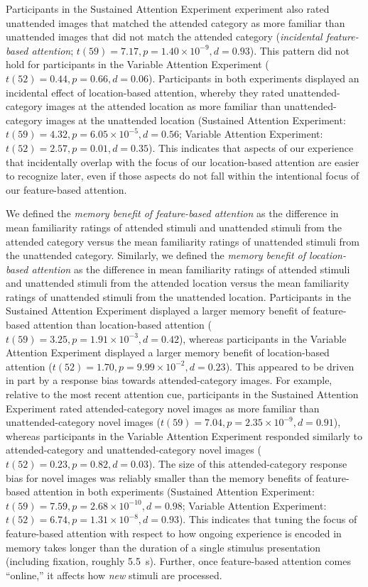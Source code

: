 \documentclass[english]{article}
\begin{document}
Participants in the Sustained Attention Experiment experiment also rated unattended images that matched the attended category as more familiar than unattended images that did not match the attended category (\textit{incidental feature-based attention}; $t(59) = 7.17, p = 1.40 \times 10^{-9}, d = 0.93$).  This pattern did not hold for participants in the Variable Attention Experiment ($t(52) = 0.44, p = 0.66, d = 0.06$).  Participants in both experiments displayed an incidental effect of location-based attention, whereby they rated unattended-category images at the attended location as more familiar than unattended-category images at the unattended location (Sustained Attention Experiment: $t(59) = 4.32, p = 6.05 \times 10^{-5}, d = 0.56$; Variable Attention Experiment: $t(52) = 2.57, p = 0.01, d = 0.35$).  This indicates that aspects of our experience that incidentally overlap with the focus of our location-based attention are easier to recognize later, even if those aspects do not fall within the intentional focus of our feature-based attention.

We defined the \textit{memory benefit of feature-based attention} as the difference in mean familiarity ratings of attended stimuli and unattended stimuli from the attended category versus the mean familiarity ratings of unattended stimuli from the unattended category.  Similarly, we defined the \textit{memory benefit of location-based attention} as the difference in mean familiarity ratings of attended stimuli and unattended stimuli from the attended location versus the mean familiarity ratings of unattended stimuli from the unattended location.  Participants in the Sustained Attention Experiment displayed a larger memory benefit of feature-based attention than location-based attention ($t(59) = 3.25, p = 1.91 \times 10^{-3}, d = 0.42$), whereas participants in the Variable Attention Experiment displayed a larger memory benefit of location-based attention ($t(52) = 1.70, p = 9.99 \times 10^{-2}, d = 0.23$).  This appeared to be driven in part by a response bias towards attended-category images.  For example, relative to the most recent attention cue, participants in the Sustained Attention Experiment rated attended-category novel images as more familiar than unattended-category novel images ($t(59) = 7.04, p = 2.35 \times 10^{-9}, d = 0.91$), whereas participants in the Variable Attention Experiment responded similarly to attended-category and unattended-category novel images ($t(52) = 0.23, p = 0.82, d = 0.03$).  The size of this attended-category response bias for novel images was reliably smaller than the memory benefits of feature-based attention in both experiments (Sustained Attention Experiment: $t(59) = 7.59, p = 2.68 \times 10^{-10}, d = 0.98$; Variable Attention Experiment: $t(52) = 6.74, p = 1.31 \times 10^{-8}, d = 0.93$).  This indicates that tuning the focus of feature-based attention with respect to how ongoing experience is encoded in memory takes longer than the duration of a single stimulus presentation (including fixation, roughly 5.5~s).  Further, once feature-based attention comes ``online,'' it affects how \textit{new} stimuli are processed.
\end{document}
